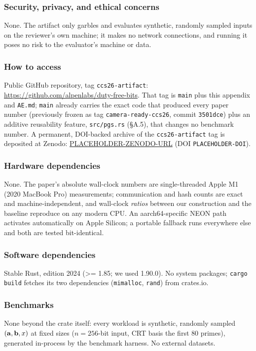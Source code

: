 \documentclass[nonacm,sigconf]{acmart}
\begin{document}
\subsubsection{Security, privacy, and ethical concerns}
None. The artifact only garbles and evaluates synthetic, randomly sampled
inputs on the reviewer's own machine; it makes no network connections, and
running it poses no risk to the evaluator's machine or data.

\subsubsection{How to access}
Public GitHub repository, tag \texttt{ccs26-artifact}:
\url{https://github.com/alpenlabs/duty-free-bits}. That tag is \texttt{main}
plus this appendix and \texttt{AE.md}; \texttt{main} already carries the
exact code that produced every paper number (previously frozen as tag
\texttt{camera-ready-ccs26}, commit \texttt{3501dce}) plus an additive
reusability feature, \texttt{src/pgs.rs} (\S A.5), that changes no benchmark
number. A permanent, DOI-backed archive of the \texttt{ccs26-artifact} tag
is deposited at Zenodo: \url{PLACEHOLDER-ZENODO-URL} (DOI
\texttt{PLACEHOLDER-DOI}).

\subsubsection{Hardware dependencies}
None. The paper's absolute wall-clock numbers are single-threaded Apple M1
(2020 MacBook Pro) measurements; communication and hash counts are exact
and machine-independent, and wall-clock \emph{ratios} between our
construction and the baseline reproduce on any modern CPU. An
aarch64-specific NEON path activates automatically on Apple Silicon; a
portable fallback runs everywhere else and both are tested bit-identical.

\subsubsection{Software dependencies}
Stable Rust, edition 2024 (\textgreater= 1.85; we used 1.90.0). No system
packages; \texttt{cargo build} fetches its two dependencies
(\texttt{mimalloc}, \texttt{rand}) from crates.io.

\subsubsection{Benchmarks}
None beyond the crate itself: every workload is synthetic, randomly sampled
$(\vb{a},\vb{b},x)$ at fixed sizes ($n=256$-bit input, CRT basis the first
80 primes), generated in-process by the benchmark harness. No external
datasets.
\end{document}
